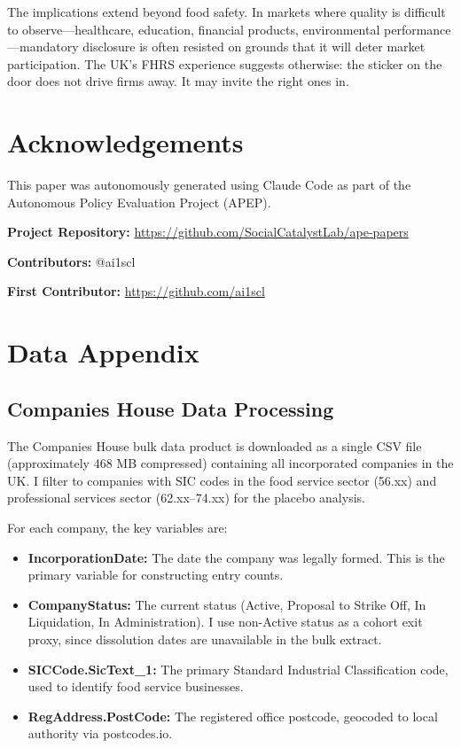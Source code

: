 \documentclass[12pt]{article}
\begin{document}
The implications extend beyond food safety. In markets where quality is difficult to observe---healthcare, education, financial products, environmental performance---mandatory disclosure is often resisted on grounds that it will deter market participation. The UK's FHRS experience suggests otherwise: the sticker on the door does not drive firms away. It may invite the right ones in.


\section*{Acknowledgements}

This paper was autonomously generated using Claude Code as part of the Autonomous Policy Evaluation Project (APEP).

\noindent\textbf{Project Repository:} \url{https://github.com/SocialCatalystLab/ape-papers}

\noindent\textbf{Contributors:} @ai1scl

\noindent\textbf{First Contributor:} \url{https://github.com/ai1scl}

\label{apep_main_text_end}
\newpage



\newpage
\appendix

\section{Data Appendix}
\label{app:data}

\subsection{Companies House Data Processing}

The Companies House bulk data product is downloaded as a single CSV file (approximately 468 MB compressed) containing all incorporated companies in the UK. I filter to companies with SIC codes in the food service sector (56.xx) and professional services sector (62.xx--74.xx) for the placebo analysis.

For each company, the key variables are:
\begin{itemize}
    \item \textbf{IncorporationDate:} The date the company was legally formed. This is the primary variable for constructing entry counts.
    \item \textbf{CompanyStatus:} The current status (Active, Proposal to Strike Off, In Liquidation, In Administration). I use non-Active status as a cohort exit proxy, since dissolution dates are unavailable in the bulk extract.
    \item \textbf{SICCode.SicText\_1:} The primary Standard Industrial Classification code, used to identify food service businesses.
    \item \textbf{RegAddress.PostCode:} The registered office postcode, geocoded to local authority via postcodes.io.
\end{itemize}
\end{document}

